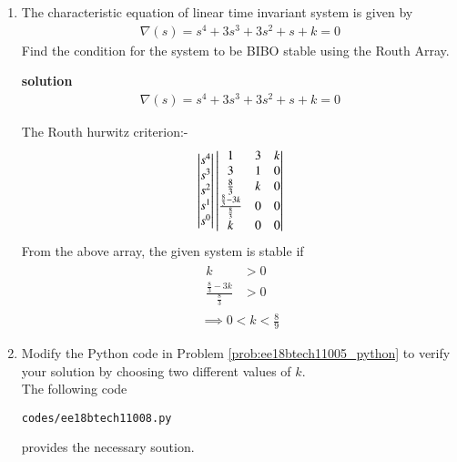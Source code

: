 \begin{enumerate}[label=\thesubsection.\arabic*.,ref=\thesubsection.\theenumi]
\item 
The characteristic equation of linear time invariant system is given by
\begin{align} 
\nabla(s)=s^4+3s^3+3s^2+s+k=0
\end{align}
Find the condition for the system to be BIBO stable using the Routh Array.

\textbf{solution}
\begin{align}
\nabla(s)=s^4+3s^3+3s^2+s+k=0
\end{align}

The Routh hurwitz criterion:-
\bigskip
\begin{align}
\begin{vmatrix}s^4\\s^3\\s^2\\s^1 \\ s^0\end{vmatrix}
\begin{vmatrix}1 & 3 & k \\ 3 & 1 & 0\\  \frac{8}{3}& k & 0\\ \frac{\frac{8}{3}-3k}{\frac{8}{3}} & 0 & 0\\k & 0 & 0\end{vmatrix} 
\end{align}
From the above array, the given system is stable if
\begin{align}
\begin{split}
k&>0 
\\
  \frac{\frac{8}{3}-3k}{\frac{8}{3}}&>0    
\end{split}
\\
\implies 0<k<\frac{8}{9}
\end{align}
%
\item Modify the Python code in Problem \ref{prob:ee18btech11005_python} to verify your solution by choosing two different values of $k$.
\label{prob:ee18btech11008_python}
\\
\solution 
The following code 
%
\begin{lstlisting}
codes/ee18btech11008.py
\end{lstlisting}
%
provides the necessary soution.

\end{enumerate}
